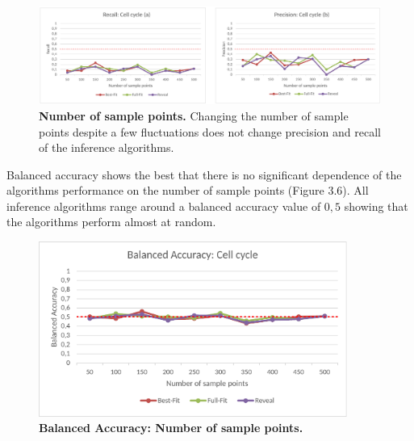 \begin{figure}[H]
\captionsetup{width=1.0\linewidth}
\centering
\includegraphics[width=1.0\textwidth]{./Bilder/Scoring/insilico/2_cellcycle_measurements/RecPrec.pdf}
\caption[Precision and Recall: Number of sample points]{\textbf{Number of sample points.} Changing the number of sample points despite a few fluctuations does not change precision and recall of the inference algorithms.}
\label{fig:}
\end{figure}
Balanced accuracy shows the best that there is no significant dependence of the algorithms performance on the number of sample points (Figure 3.6). All inference algorithms range around a balanced accuracy value of $0,5$ showing that the algorithms perform almost at random.
\begin{figure}[H]
\captionsetup{width=0.9\linewidth}
\centering
\includegraphics[width=0.9\textwidth]{./Bilder/Scoring/insilico/2_cellcycle_measurements/Bacc.pdf}
\caption[Balanced Accuracy: Number of sample points]{\textbf{Balanced Accuracy: Number of sample points.}}
\label{fig:}
\end{figure}

